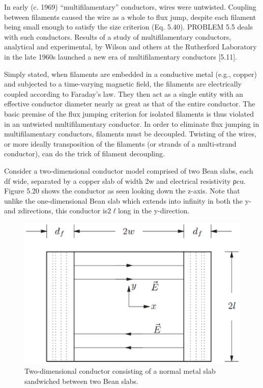 In early (c. 1969) “multifilamentary” conductors, wires were untwisted. Coupling
between filaments caused the wire as a whole to flux jump, despite each filament
being small enough to satisfy the size criterion (Eq. 5.40). PROBLEM 5.5 deals
with such conductors. Results of a study of multifilamentary conductors, analytical
and experimental, by Wilson and others at the Rutherford Laboratory in the late
1960s launched a new era of multifilamentary conductors [5.11].

Simply stated, when filaments are embedded in a conductive metal (e.g., copper)
and subjected to a time-varying magnetic field, the filaments are electrically coupled
according to Faraday’s law. They then act as a single entity with an effective
conductor diameter nearly as great as that of the entire conductor. The basic
premise of the flux jumping criterion for isolated filaments is thus violated in an
untwisted multifilamentary conductor. In order to eliminate flux jumping in multifilamentary
conductors, filaments must be decoupled. Twisting of the wires, or
more ideally transposition of the filaments (or strands of a multi-strand conductor),
can do the trick of filament decoupling.

Consider a two-dimensional conductor model comprised of two Bean slabs, each
df wide, separated by a copper slab of width 2w and electrical resistivity ρcu.
Figure 5.20 shows the conductor as seen looking down the z-axis. Note that unlike
the one-dimensional Bean slab which extends into infinity in both the y- and zdirections,
this conductor is$2\ell$long in the y-direction.

\begin{figure}
	\centering
	\includegraphics[scale=0.6]{chpt5/figs/fig5.20.eps}
	\caption{Two-dimensional conductor consisting of a normal
		metal slab sandwiched between two Bean slabs.}
\end{figure}

